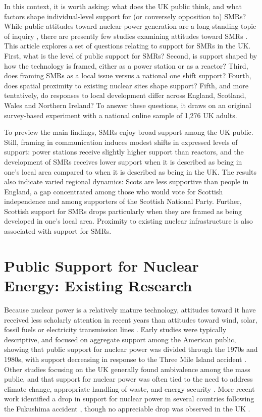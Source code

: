 \documentclass[a4paper, 11pt]{article}
\begin{document}
In this context, it is worth asking: what does the UK public think, and what factors shape individual-level support for (or conversely opposition to) SMRs? While public attitudes toward nuclear power generation are a long-standing topic of inquiry \citep{aina_poy2026,bickerstaff2008,corner2011,venables2012}, there are presently few studies examining attitudes toward SMRs \citep[but see][]{durdovic2025,jones2026,hlavacek2023,kiviluoma2025,osiolo2026}. This article explores a set of questions relating to support for SMRs in the UK. First, what is the level of public support for SMRs? Second, is support shaped by how the technology is framed, either as a power station or as a reactor? Third, does framing SMRs as a local issue versus a national one shift support? Fourth, does spatial proximity to existing nuclear sites shape support? Fifth, and more tentatively, do responses to local development differ across England, Scotland, Wales and Northern Ireland? To answer these questions, it draws on an original survey-based experiment \citep{druckman2022,mutz2011} with a national online sample of 1,276 UK adults.

To preview the main findings, SMRs enjoy broad support among the UK public. Still, framing in communication induces modest shifts in expressed levels of support: power stations receive slightly higher support than reactors, and the development of SMRs receives lower support when it is described as being in one's local area compared to when it is described as being in the UK. The results also indicate varied regional dynamics: Scots are less supportive than people in England, a gap concentrated among those who would vote for Scottish independence and among supporters of the Scottish National Party. Further, Scottish support for SMRs drops particularly when they are framed as being developed in one's local area. Proximity to existing nuclear infrastructure is also associated with support for SMRs.

\section*{Public Support for Nuclear Energy: Existing Research}
Because nuclear power is a relatively mature technology, attitudes toward it have received less scholarly attention in recent years than attitudes toward wind, solar, fossil fuels or electricity transmission lines \citep{carley2020}. Early studies were typically descriptive, and focused on aggregate support among the American public, showing that public support for nuclear power was divided through the 1970s and 1980s, with support decreasing in response to the Three Mile Island accident \citep{freudenburg1985, rosa1994}. Other studies focusing on the UK generally found ambivalence among the mass public, and that support for nuclear power was often tied to the need to address climate change, appropriate handling of waste, and energy security \citep{bickerstaff2008,grovewhite2006,pidgeon2008,corner2011}. More recent work identified a drop in support for nuclear power in several countries following the Fukushima accident \citep{latre2017}, though no appreciable drop was observed in the UK \citep{jones2016}.
\end{document}
